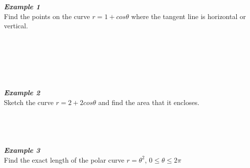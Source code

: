 \documentclass[12px]{article}
\begin{document}
\begin{multicols}{2}
    \noindent\textbf{\textit{Example 1}}\\
    Find the points on the curve $r=1+cos\theta$ where the tangent line is horizontal or vertical.\\
    \\
    \\
    \\
    \\
    \\
    \\
    \textbf{\textit{Example 2}}\\
    Sketch the curve $r=2+2cos\theta$ and find the area that it encloses.\\
    \\
    \\
    \\
    \\
    \textbf{\textit{Example 3}}\\
    Find the exact length of the polar curve $r=\theta^2$, $0\leq\theta\leq 2\pi$\\
    \\
    \\
    \\
    \\
    \\
    \\
    \\
    \\
    \\
    \\
    \\
\end{multicols}
\end{document}
